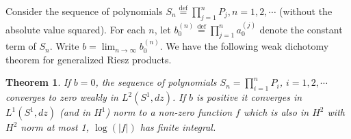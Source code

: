 \documentclass{amsart}
\newtheorem{Th}{Theorem}[section]
\theoremstyle{definition}
\theoremstyle{remark}
\numberwithin{equation}{section}
\newcommand{\1}{\mathbb{1}}
\begin{document}
 Consider the sequence of polynomials $ S_n \stackrel{\textrm {def}}{=} \prod_{j=1}^nP_j, n=1,2,\cdots$ (without the absolute value squared). For each $n$, let  $b_0^{(n)} \stackrel{\textrm {def}}{=} \prod_{j=1}^n a_0^{(j)}$ denote the constant term of $S_n$. Write $ b =\lim_{n\rightarrow \infty}b_0^{(n)}$. We have the following  weak dichotomy theorem for generalized Riesz products.

 \begin{Th}\label{th1}
 If $b=0$, the  sequence of polynomials $S_n =\prod_{i=1}^nP_i$, $i =1,2,\cdots$ converges to zero weakly in $L^2(S^1,dz)$.  If $b$ is positive it converges in $L^1(S^1, dz)$ (and in $H^1$) norm to a non-zero function $f$ which is also in $H^2$ with $H^2$ norm at most 1, $\log(|f|)$ has finite integral.
\end{Th}
\end{document}
